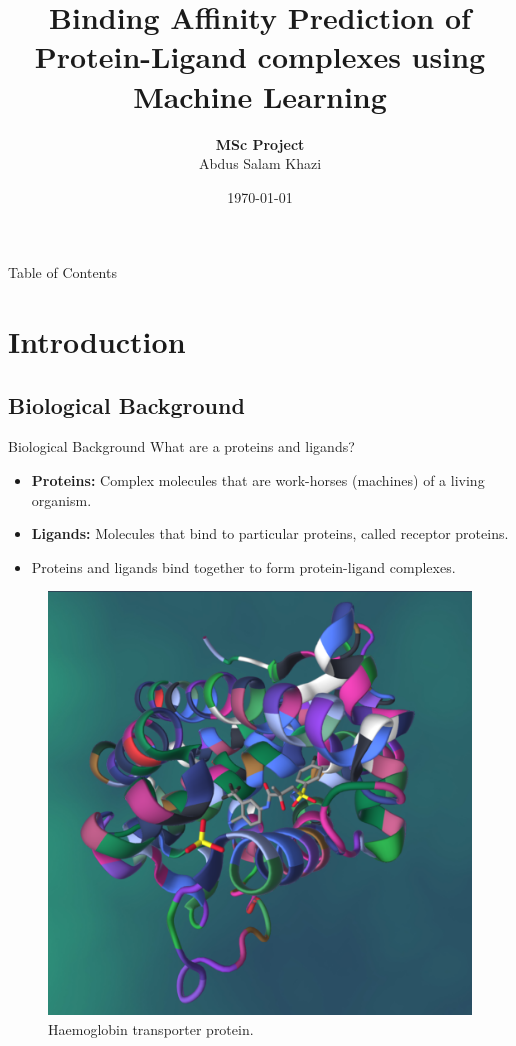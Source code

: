 \documentclass{beamer}
\title[Binding affinity prediction of PL complexes using ML]{Binding Affinity Prediction of Protein-Ligand complexes using Machine Learning}
\author[Abdus Salam Khazi]
{
    \textbf{MSc Project}\\
    Abdus Salam Khazi
}
\institute{Supervisors: \\
            \begin{tabular}{ll}
		    	Simon Bray \& Alireza Khanteymoori
		    \end{tabular}
}
\date{\today}
\begin{document}
\begin{frame}
\titlepage
\end{frame}

\begin{frame}{Table of Contents}
\tableofcontents
\end{frame}

\section{Introduction}

\subsection{Biological Background}

\begin{frame}[t]{Biological Background}
What are a proteins and ligands? 
\begin{itemize}
\item \textbf{Proteins:} Complex molecules that are work-horses (machines) of a living organism.
\item \textbf{Ligands:} Molecules that bind to particular proteins, called receptor proteins.

\item Proteins and ligands bind together to form protein-ligand complexes.

\end{itemize}

\begin{figure}[htb]
  \centering
    \includegraphics[scale=0.07]{images/pl_complex}
    \caption{Haemoglobin transporter protein.}
    \label{fig:HaemoglobinTransporterImage}
\end{figure}

\end{frame}
\end{document}
